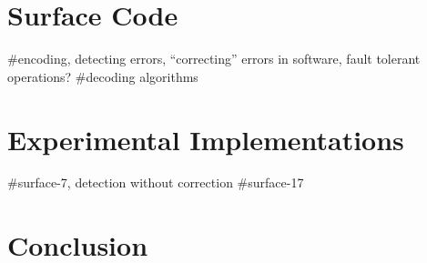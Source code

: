 \documentclass[conference]{IEEEtran}
\begin{document}


\section{Surface Code}
#encoding, detecting errors, ``correcting'' errors in software, fault tolerant
operations?
#decoding algorithms


\section{Experimental Implementations}
#surface-7, detection without correction
#surface-17


\section{Conclusion}


\pagebreak
\printbibliography
\end{document}
